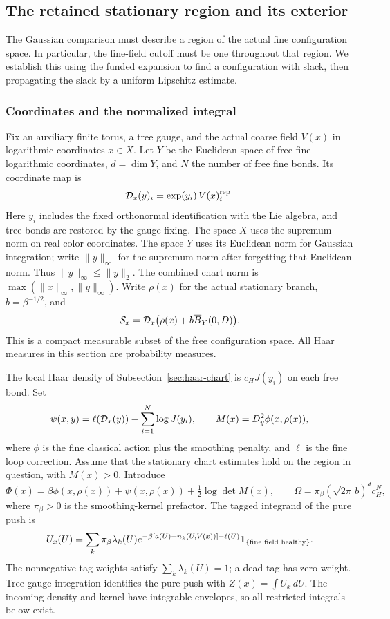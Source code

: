 \subsection{The retained stationary region and its exterior}
\label{sec:stationary-exterior-receipt}
The Gaussian comparison must describe a region of the actual fine
configuration space. In particular, the fine-field cutoff must be
one throughout that region. We establish this using the funded
expansion to find a configuration with slack, then propagating the
slack by a uniform Lipschitz estimate.

\subsubsection{Coordinates and the normalized integral}
Fix an auxiliary finite torus, a tree gauge, and the actual coarse
field $V(x)$ in logarithmic coordinates $x\in X$. Let $Y$ be the
Euclidean space of free fine logarithmic coordinates, $d=\dim Y$,
and $N$ the number of free fine bonds. Its coordinate map is
\[
 {\cal D}_x(y)_i=\exp(y_i)\,V(x)^{\rm rep}_i.
\]
Here $y_i$ includes the fixed orthonormal identification with the
Lie algebra, and tree bonds are restored by the gauge fixing. The space $X$
uses the supremum norm on real color coordinates. The space $Y$
uses its Euclidean norm for Gaussian integration; write
$\|y\|_\infty$ for the supremum norm after forgetting that
Euclidean norm. Thus $\|y\|_\infty\le\|y\|_2$. The combined
chart norm is $\max(\|x\|_\infty,\|y\|_\infty)$.
Write $\rho(x)$ for the actual stationary branch, $b=\beta^{-1/2}$,
and
\[
 \mathcal S_x={\cal D}_x\bigl(\rho(x)+b\overline B_Y(0,D)\bigr).
\]
This is a compact measurable subset of the free configuration
space. All Haar measures in this section are probability measures.

The local Haar density of Subsection~\ref{sec:haar-chart} is
$c_H J(y_i)$ on each free bond. Set
\[
 \psi(x,y)=\ell({\cal D}_x(y))-\sum_{i=1}^{N}\log J(y_i),
 \qquad M(x)=D_y^2\phi(x,\rho(x)),
\]
where $\phi$ is the fine classical action plus the smoothing
penalty, and $\ell$ is the fine loop correction. Assume that the
stationary chart estimates hold on the region in question, with
$M(x)>0$. Introduce
\[
 \Phi(x)=\beta\phi(x,\rho(x))+\psi(x,\rho(x))
                         +\tfrac12\log\det M(x),\qquad
 \Omega=\pi_\beta(\sqrt{2\pi}\,b)^d c_H^N,
\]
where $\pi_\beta>0$ is the smoothing-kernel prefactor.
The tagged integrand of the pure push is
\begin{equation}\label{eq:exterior-tag-integrand}
 U_x(U)=\sum_k\pi_\beta\lambda_k(U)
   e^{-\beta[ a(U)+n_k(U,V(x))]-\ell(U)}
                    {\bf1}_{\{\text{fine field healthy}\}}.
\end{equation}
The nonnegative tag weights satisfy $\sum_k\lambda_k(U)=1$;
a dead tag has zero weight. Tree-gauge integration identifies the
pure push with $Z(x)=\int U_x\,dU$. The incoming density and kernel
have integrable envelopes, so all restricted integrals below exist.

